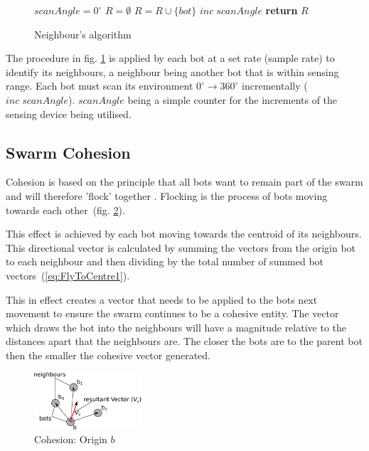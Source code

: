 \documentclass[10pt,journal,letterpaper,twoside]{IEEEtran}
\newcommand{\Fig}{fig.}
\begin{document}
\begin{figure}[H]
\begin{algorithmic}[1]
\State $scanAngle = 0^\circ$\;
\State $R = \emptyset$\;
 
   
    \State $R = R \cup \{bot\}$\;
  \EndIf
  \State $inc\; scanAngle$
\EndWhile
\State \textbf{return} $R$
\EndProcedure
\end{algorithmic}
\caption{Neighbour's algorithm}\label{algo:neighbourDetect}
\end{figure}

The procedure in \Fig{} \ref{algo:neighbourDetect} is applied by each
bot at a set rate (sample rate) to identify its neighbours, a
neighbour being another bot that is within sensing range. Each bot
must scan its environment $0^\circ \rightarrow 360^\circ$
incrementally ($inc\; scanAngle$). $scanAngle$ being a simple counter
for the increments of the sensing device being utilised.

\subsection{Swarm Cohesion}
Cohesion is based on the principle that all bots want to remain part
of the swarm and will therefore 'flock' together
\cite{VGKP04}. Flocking is the process of bots moving towards each
other~(\Fig{} \ref{methods:FlyToCentre1}).

This effect is achieved by each bot moving towards the centroid of its
neighbours. This directional vector is calculated by summing the
vectors from the origin bot to each neighbour and then dividing by the
total number of summed bot vectors~(\ref{eq:FlyToCentre1}).

This in effect creates a vector that needs to be applied to the bots
next movement to ensure the swarm continues to be a cohesive
entity. The vector which draws the bot into the neighbours will have a
magnitude relative to the distances apart that the neighbours are. The
closer the bots are to the parent bot then the smaller the cohesive
vector generated.

\begin{figure}[H]
\begin{center}
\includegraphics[width=4cm]{figures/FlyToCentre1}
\end{center}
\caption{Cohesion: Origin $b$ \label{methods:FlyToCentre1}}
\end{figure}
\end{document}
